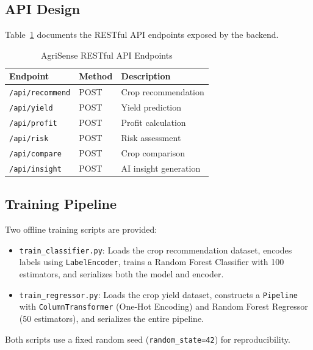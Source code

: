 \subsection{API Design}
Table~\ref{tab:api_endpoints} documents the RESTful API endpoints exposed by the backend.

\begin{table}[htbp]
\caption{AgriSense RESTful API Endpoints}
\label{tab:api_endpoints}
\centering
\begin{tabular}{@{}lll@{}}
\toprule
\textbf{Endpoint} & \textbf{Method} & \textbf{Description} \\
\midrule
\texttt{/api/recommend} & POST & Crop recommendation \\
\texttt{/api/yield} & POST & Yield prediction \\
\texttt{/api/profit} & POST & Profit calculation \\
\texttt{/api/risk} & POST & Risk assessment \\
\texttt{/api/compare} & POST & Crop comparison \\
\texttt{/api/insight} & POST & AI insight generation \\
\bottomrule
\end{tabular}
\end{table}

\subsection{Training Pipeline}
Two offline training scripts are provided:

\begin{itemize}
    \item \texttt{train\_classifier.py}: Loads the crop recommendation dataset, encodes labels using \texttt{LabelEncoder}, trains a Random Forest Classifier with 100 estimators, and serializes both the model and encoder.
    \item \texttt{train\_regressor.py}: Loads the crop yield dataset, constructs a \texttt{Pipeline} with \texttt{ColumnTransformer} (One-Hot Encoding) and Random Forest Regressor (50 estimators), and serializes the entire pipeline.
\end{itemize}

Both scripts use a fixed random seed (\texttt{random\_state=42}) for reproducibility.
